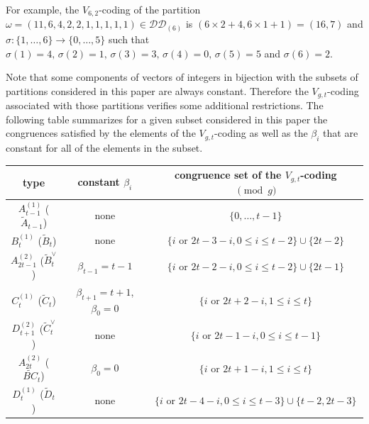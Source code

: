 \documentclass[11pt,letterpaper]{amsart}
\def\ccdd{\mathcal {DD}}
\numberwithin{equation}{section}
\numberwithin{df}{section}
\begin{document}
For example, the $V_{6,2}$-coding of the partition $\omega=(11,6,4,2,2,1,1,1,1,1)\in\ccdd_{(6)}$ is $(6\times 2+4,6\times 1+1)=(16,7)$ and $\sigma:\lbrace 1,\dots ,6\rbrace\rightarrow \lbrace 0,\dots, 5\rbrace$ such that $\sigma(1)=4, \,\sigma(2)=1,\,\sigma(3)=3,\,\sigma(4)=0,\,\sigma(5)=5$ and $\sigma(6)=2$.

Note that some components of vectors of integers in bijection with the subsets of partitions considered in this paper are always constant. Therefore the $V_{g,t}$-coding associated with those partitions verifies some additional restrictions. The following table summarizes for a given subset considered in this paper the congruences satisfied by the elements of the $V_{g,t}$-coding as well as the $\beta_i$ that are constant for all of the elements in the subset.

\begin{center}
\begin{tabular}{|c|c|c|}
\hline
type & constant $\beta_i$ & congruence set of the $V_{g,t}$-coding $\pmod{g}$  \\
\hline
\rule{0pt}{15pt}$A^{(1)}_{t-1}$ ($\tilde{A}_{t-1}$) &  none &  $\lbrace 0,\dots,t-1\rbrace$\\
\hline
\rule{0pt}{15pt}$B^{(1)}_{t}$ ($\tilde{B}_t$) &  none &  $\lbrace i \text{ or } 2t-3-i, 0\leq i\leq t-2\rbrace\cup\lbrace 2t-2\rbrace$\\
\hline
\rule{0pt}{15pt}$A^{(2)}_{2t-1}$ ($\tilde{B}_t^{\vee}$) &  $\beta_{t-1}=t-1$ &  $\lbrace i \text{ or } 2t-2-i, 0\leq i\leq t-2\rbrace\cup\lbrace 2t-1\rbrace$ \\
\hline
\rule{0pt}{15pt}$C^{(1)}_{t}$ ($\tilde{C}_t$)&  $\beta_{t+1}=t+1$, $\beta_0=0$ &  $\lbrace i \text{ or } 2t+2-i, 1\leq i\leq t\rbrace$\\
\hline
\rule{0pt}{15pt}$D^{(2)}_{t+1}$ ($\tilde{C}_{t}^{\vee}$)&  none &  $\lbrace i \text{ or } 2t-1-i, 0\leq i\leq t-1\rbrace$\\
\hline
\rule{0pt}{15pt}$A^{(2)}_{2t}$ ($\tilde{BC}_{t}$)&  $\beta_0=0$ &   $\lbrace i \text{ or } 2t+1-i, 1\leq i\leq t\rbrace$\\
\hline
\rule{0pt}{15pt}$D^{(1)}_{t}$ ($\tilde{D}_{t}$)&  none &  $\lbrace i \text{ or } 2t-4-i, 0\leq i\leq t-3\rbrace\cup\lbrace t-2,2t-3\rbrace$\\
\hline

\end{tabular}
\label{tableau_cond}
\end{center}
\end{document}

